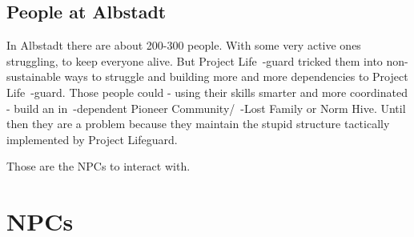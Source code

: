 
\subsection{People at Albstadt}

In Albstadt there are about 200-300 people. With some very active ones struggling, to keep everyone alive. But Project Life~-guard tricked them into non-sustainable ways to struggle and building more and more dependencies to Project Life~-guard. Those people could - using their skills smarter and more coordinated - build an in~-dependent Pioneer Community/~-Lost Family or Norm Hive. Until then they are a problem because they maintain the stupid structure tactically implemented by Project Lifeguard.

Those are the NPCs to interact with.

\section{NPCs}


